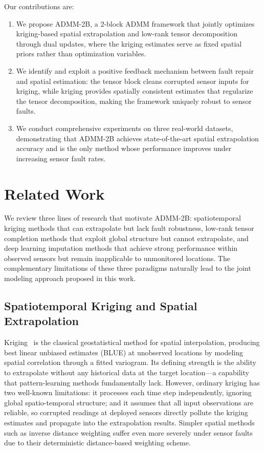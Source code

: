 \documentclass[journal]{IEEEtran}
\begin{document}
Our contributions are:
\begin{enumerate}
\item We propose ADMM-2B, a 2-block ADMM framework that jointly optimizes kriging-based spatial extrapolation and low-rank tensor decomposition through dual updates, where the kriging estimates serve as fixed spatial priors rather than optimization variables.
\item We identify and exploit a positive feedback mechanism between fault repair and spatial estimation: the tensor block cleans corrupted sensor inputs for kriging, while kriging provides spatially consistent estimates that regularize the tensor decomposition, making the framework uniquely robust to sensor faults.
\item We conduct comprehensive experiments on three real-world datasets, demonstrating that ADMM-2B achieves state-of-the-art spatial extrapolation accuracy and is the only method whose performance improves under increasing sensor fault rates.
\end{enumerate}

\section{Related Work}\label{sec:related}

We review three lines of research that motivate ADMM-2B: spatiotemporal kriging methods that can extrapolate but lack fault robustness, low-rank tensor completion methods that exploit global structure but cannot extrapolate, and deep learning imputation methods that achieve strong performance within observed sensors but remain inapplicable to unmonitored locations. The complementary limitations of these three paradigms naturally lead to the joint modeling approach proposed in this work.

\subsection{Spatiotemporal Kriging and Spatial Extrapolation}

Kriging~\cite{cressie2015statistics} is the classical geostatistical method for spatial interpolation, producing best linear unbiased estimates (BLUE) at unobserved locations by modeling spatial correlation through a fitted variogram. Its defining strength is the ability to extrapolate without any historical data at the target location---a capability that pattern-learning methods fundamentally lack. However, ordinary kriging has two well-known limitations: it processes each time step independently, ignoring global spatio-temporal structure; and it assumes that all input observations are reliable, so corrupted readings at deployed sensors directly pollute the kriging estimates and propagate into the extrapolation results. Simpler spatial methods such as inverse distance weighting suffer even more severely under sensor faults due to their deterministic distance-based weighting scheme.
\end{document}
